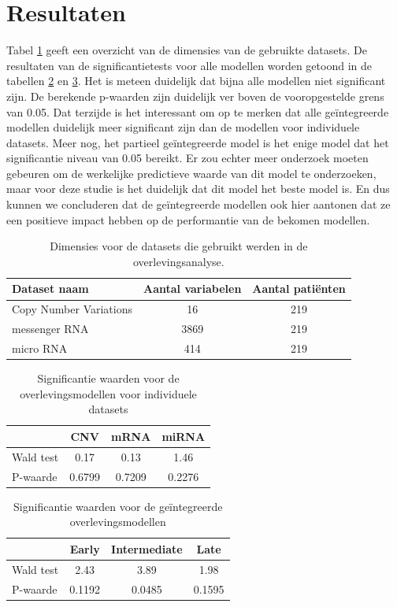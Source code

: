 \section{Resultaten}
Tabel \ref{tab:D:evaluation-case2-dimensions} geeft een overzicht van de dimensies van de gebruikte datasets. De resultaten van de significantietests voor alle modellen worden getoond in de tabellen \ref{tab:D:evaluation-surv-individual} en \ref{tab:D:evaluation-surv-integrated}. Het is meteen duidelijk dat bijna alle modellen niet significant zijn. De berekende p-waarden zijn duidelijk ver boven de vooropgestelde grens van 0.05. Dat terzijde is het interessant om op te merken dat alle ge\"integreerde modellen duidelijk meer significant zijn dan de modellen voor individuele datasets. Meer nog, het partieel ge\"integreerde model is het enige model dat het significantie niveau van 0.05 bereikt. Er zou echter meer onderzoek moeten gebeuren om de werkelijke predictieve waarde van dit model te onderzoeken, maar voor deze studie is het duidelijk dat dit model het beste model is. En dus kunnen we concluderen dat de ge\"integreerde modellen ook hier aantonen dat ze een positieve impact hebben op de performantie van de bekomen modellen.
\begin{table}
	\centering
	\begin{tabular}{lcc}
		\toprule
		Dataset naam & Aantal variabelen & Aantal pati\"enten \\
		\midrule
		Copy Number Variations & 16 & 219\\
		messenger RNA & 3869 & 219 \\
		micro RNA & 414 & 219 \\
		\bottomrule
	\end{tabular}
	\caption{Dimensies voor de datasets die gebruikt werden in de overlevingsanalyse.}
	\label{tab:D:evaluation-case2-dimensions}
\end{table}

\begin{table}
	\centering
	\begin{tabular}{lccc}
		\toprule
		& CNV    & mRNA & miRNA \\
		\midrule
		Wald test 					& 0.17 & 0.13  & 1.46 \\
		P-waarde 					& 0.6799 & 0.7209  & 0.2276 \\
		\bottomrule
	\end{tabular}
	\caption{Significantie waarden voor de overlevingsmodellen voor individuele datasets}
	\label{tab:D:evaluation-surv-individual}
\end{table}

\begin{table}
	\centering
	\begin{tabular}{lccc} 
		\toprule
		& Early & Intermediate & Late\\
		\midrule
		Wald test 					& 2.43 & 3.89 & 1.98 \\
		P-waarde 					& 0.1192 & 0.0485 & 0.1595 \\
		\bottomrule
	\end{tabular}
	\caption{Significantie waarden voor de ge\"integreerde overlevingsmodellen}
	\label{tab:D:evaluation-surv-integrated}
\end{table}
